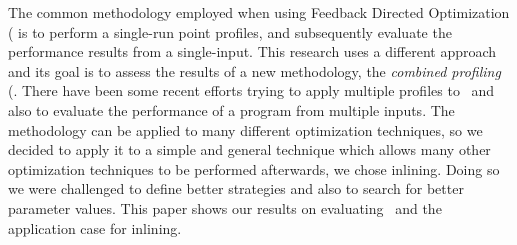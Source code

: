
The common methodology employed when using Feedback Directed Optimization
(\FDO\) is to perform a single-run point profiles, and subsequently evaluate the performance
results from a single-input. This research uses a different approach and its goal is to assess
the results of a new methodology, the {\em combined profiling} (\CP\). There have been some
recent efforts trying to apply multiple profiles to \FDO\, and also to evaluate the performance
of a program from multiple inputs. The methodology can be applied to many different
optimization techniques, so we decided to apply it to a simple and general technique
which allows many other optimization techniques to be performed afterwards, we chose
inlining. Doing so we were challenged to define better strategies and also to search for
better parameter values. This paper shows our results on evaluating \CP\ and the application
case for inlining.



